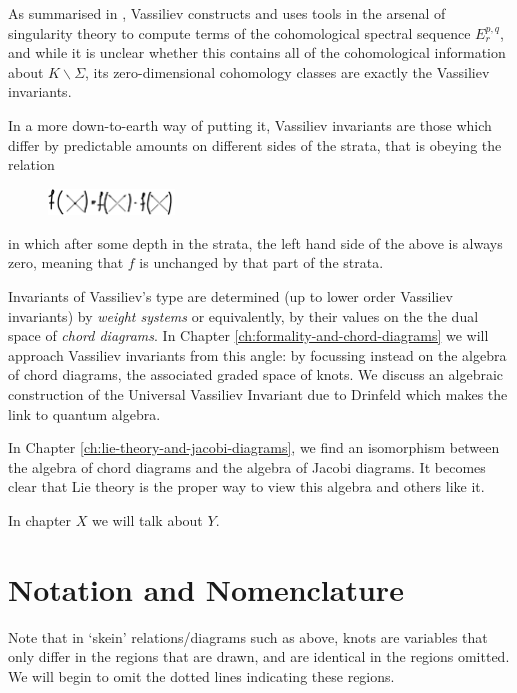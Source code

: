 \documentclass[12pt]{report}
\theoremstyle{regular}
\numberwithin{clause}{chapter}
\newcommand{\scaffold}[1]{
\begin{mdframed}[style=scaffold]
        {\color{teal}#1}
\end{mdframed}
}
\begin{document}
        As summarised in \cite{introduction-to-vassiliev-invariants}, Vassiliev constructs and uses tools in the arsenal of singularity theory to compute terms of the cohomological spectral sequence \(E^{p, q}_{r}\), and while it is unclear whether this contains all of the cohomological information about \({K \smallsetminus \Sigma}\), its zero-dimensional cohomology classes are exactly the Vassiliev invariants.

        In a more down-to-earth way of putting it, Vassiliev invariants are those which differ by predictable amounts on different sides of the strata, that is obeying the relation
        \begin{figure}[H]
                \centering
                \includegraphics[width=0.3\textwidth]{graphics/vassiliev_relation.png}
        \end{figure}
        \noindent
        in which after some depth in the strata, the left hand side of the above is always zero, meaning that \(f\) is unchanged by that part of the strata.

        Invariants of Vassiliev's type are determined (up to lower order Vassiliev invariants) by \textit{weight systems} or equivalently, by their values on the the dual space of \textit{chord diagrams}. In Chapter \ref{ch:formality-and-chord-diagrams} we will approach Vassiliev invariants from this angle: by focussing instead on the algebra of chord diagrams, the associated graded space of knots. We discuss an algebraic construction of the Universal Vassiliev Invariant due to Drinfeld which makes the link to quantum algebra.

        In Chapter \ref{ch:lie-theory-and-jacobi-diagrams}, we find an isomorphism between the algebra of chord diagrams and the algebra of Jacobi diagrams. It becomes clear that Lie theory is the proper way to view this algebra and others like it.

        \scaffold{In chapter \(X\) we will talk about \(Y\).}

        \section*{Notation and Nomenclature}


        Note that in `skein' relations/diagrams such as above, knots are variables that only differ in the regions that are drawn, and are identical in the regions omitted. We will begin to omit the dotted lines indicating these regions.
\end{document}
